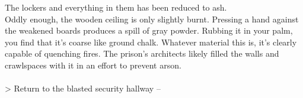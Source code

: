 The lockers and everything in them has been reduced to ash.\\

Oddly enough, the wooden ceiling is only slightly burnt. Pressing a hand against the weakened boards produces a spill of gray powder. Rubbing it in your palm, you find that it's coarse like ground chalk. Whatever material this is, it's clearly capable of quenching fires. The prison's architects likely filled the walls and crawlspaces with it in an effort to prevent arson.\\
\\

> Return to the blasted security hallway -- 
